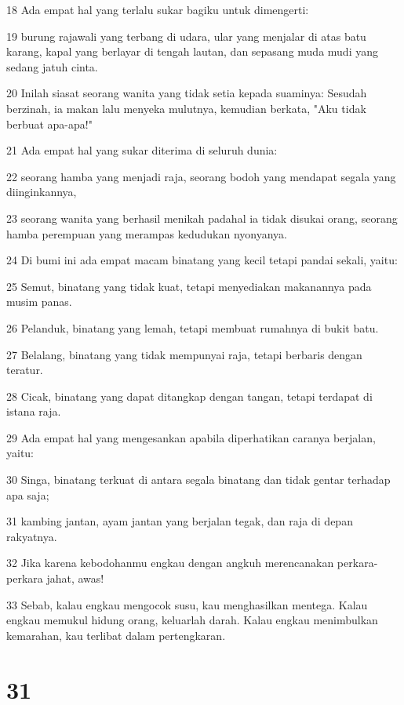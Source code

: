 \par 18 Ada empat hal yang terlalu sukar bagiku untuk dimengerti:
\par 19 burung rajawali yang terbang di udara, ular yang menjalar di atas batu karang, kapal yang berlayar di tengah lautan, dan sepasang muda mudi yang sedang jatuh cinta.
\par 20 Inilah siasat seorang wanita yang tidak setia kepada suaminya: Sesudah berzinah, ia makan lalu menyeka mulutnya, kemudian berkata, "Aku tidak berbuat apa-apa!"
\par 21 Ada empat hal yang sukar diterima di seluruh dunia:
\par 22 seorang hamba yang menjadi raja, seorang bodoh yang mendapat segala yang diinginkannya,
\par 23 seorang wanita yang berhasil menikah padahal ia tidak disukai orang, seorang hamba perempuan yang merampas kedudukan nyonyanya.
\par 24 Di bumi ini ada empat macam binatang yang kecil tetapi pandai sekali, yaitu:
\par 25 Semut, binatang yang tidak kuat, tetapi menyediakan makanannya pada musim panas.
\par 26 Pelanduk, binatang yang lemah, tetapi membuat rumahnya di bukit batu.
\par 27 Belalang, binatang yang tidak mempunyai raja, tetapi berbaris dengan teratur.
\par 28 Cicak, binatang yang dapat ditangkap dengan tangan, tetapi terdapat di istana raja.
\par 29 Ada empat hal yang mengesankan apabila diperhatikan caranya berjalan, yaitu:
\par 30 Singa, binatang terkuat di antara segala binatang dan tidak gentar terhadap apa saja;
\par 31 kambing jantan, ayam jantan yang berjalan tegak, dan raja di depan rakyatnya.
\par 32 Jika karena kebodohanmu engkau dengan angkuh merencanakan perkara-perkara jahat, awas!
\par 33 Sebab, kalau engkau mengocok susu, kau menghasilkan mentega. Kalau engkau memukul hidung orang, keluarlah darah. Kalau engkau menimbulkan kemarahan, kau terlibat dalam pertengkaran.

\chapter{31}

